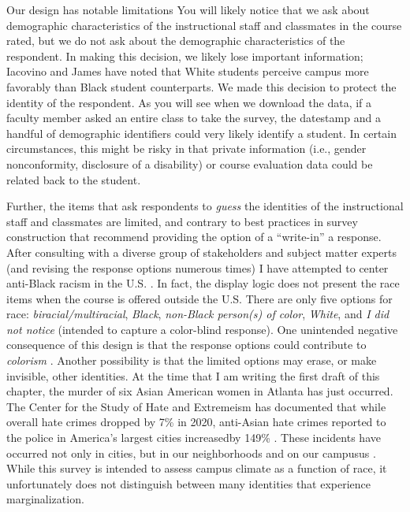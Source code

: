 \documentclass[
  11pt,
]{book}
\begin{document}
Our design has notable limitations You will likely notice that we ask about demographic characteristics of the instructional staff and classmates in the course rated, but we do not ask about the demographic characteristics of the respondent. In making this decision, we likely lose important information; Iacovino and James \citeyearpar{iacovino_retaining_2016} have noted that White students perceive campus more favorably than Black student counterparts. We made this decision to protect the identity of the respondent. As you will see when we download the data, if a faculty member asked an entire class to take the survey, the datestamp and a handful of demographic identifiers could very likely identify a student. In certain circumstances, this might be risky in that private information (i.e., gender nonconformity, disclosure of a disability) or course evaluation data could be related back to the student.

Further, the items that ask respondents to \emph{guess} the identities of the instructional staff and classmates are limited, and contrary to best practices in survey construction that recommend providing the option of a ``write-in'' a response. After consulting with a diverse group of stakeholders and subject matter experts (and revising the response options numerous times) I have attempted to center anti-Black racism in the U.S. \citep{mosley_critical_2021, mosley_radical_2020, singh_building_2020}. In fact, the display logic does not present the race items when the course is offered outside the U.S. There are only five options for race: \emph{biracial/multiracial}, \emph{Black}, \emph{non-Black person(s) of color}, \emph{White}, and \emph{I did not notice} (intended to capture a color-blind response). One unintended negative consequence of this design is that the response options could contribute to \emph{colorism} \citep{adames_fallacy_2021, capielo_rosario_acculturation_2019}. Another possibility is that the limited options may erase, or make invisible, other identities. At the time that I am writing the first draft of this chapter, the murder of six Asian American women in Atlanta has just occurred. The Center for the Study of Hate and Extremeism has documented that while overall hate crimes dropped by 7\% in 2020, anti-Asian hate crimes reported to the police in America's largest cities increasedby 149\% \citep{noauthor_fact_nodate}. These incidents have occurred not only in cities, but in our neighborhoods and on our campusus \citep{kim_guest_2021, kim_yes_2021, noauthor_stop_nodate}. While this survey is intended to assess campus climate as a function of race, it unfortunately does not distinguish between many identities that experience marginalization.
\end{document}
